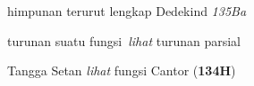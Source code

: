 \indexmedskip




























{himpunan terurut lengkap Dedekind }
{\it 135Ba}





















































turunan suatu fungsi\ {\it lihat} turunan parsial





















Tangga Setan {\it lihat} fungsi Cantor ({\bf 134H})











